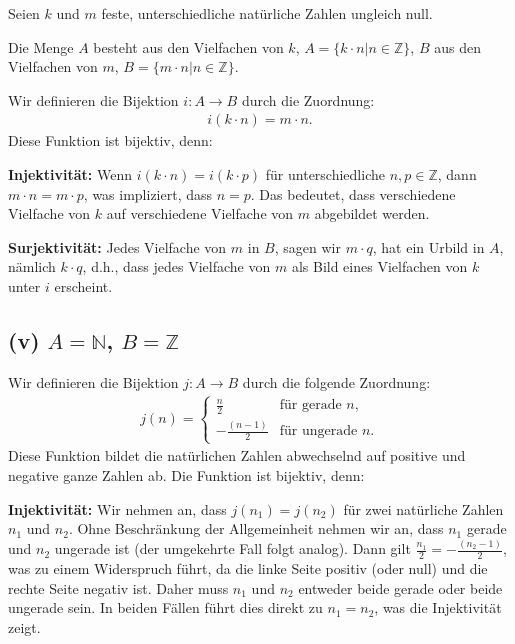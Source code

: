 \documentclass[12pt]{article}
\begin{document}
Seien \( k \) und \( m \) feste, unterschiedliche natürliche Zahlen ungleich null.

Die Menge \( A \) besteht aus den Vielfachen von \( k \), \( A = \{k \cdot n | n \in \mathbb{Z}\} \), \( B \) aus den Vielfachen von \( m \), \( B = \{m \cdot n | n \in \mathbb{Z}\} \).

Wir definieren die Bijektion \( i : A \rightarrow B \) durch die Zuordnung:
\begin{align*}
	i(k \cdot n) = m \cdot n.
\end{align*}
Diese Funktion ist bijektiv, denn:

\textbf{Injektivität:} Wenn \( i(k \cdot n) = i(k \cdot p)\) für unterschiedliche \( n, p \in \mathbb{Z}\), dann \( m \cdot n = m \cdot p \), was impliziert, dass \( n = p \). Das bedeutet, dass verschiedene Vielfache von \( k \) auf verschiedene Vielfache von \( m \) abgebildet werden.

\textbf{Surjektivität:} Jedes Vielfache von \( m \) in \( B \), sagen wir \( m \cdot q \), hat ein Urbild in \( A \), nämlich \( k \cdot q \), d.h., dass jedes Vielfache von \( m \) als Bild eines Vielfachen von \( k \) unter \( i \) erscheint.

\subsection*{(v) \( A = \mathbb{N} \), \( B = \mathbb{Z} \)}

Wir definieren die Bijektion \( j: A \rightarrow B \) durch die folgende Zuordnung:
\begin{align*}
	j(n) =
	\begin{cases}
		\frac{n}{2}      & \text{für gerade } n,   \\
		-\frac{(n-1)}{2} & \text{für ungerade } n.
	\end{cases}
\end{align*}
Diese Funktion bildet die natürlichen Zahlen abwechselnd auf positive und negative ganze Zahlen ab. Die Funktion ist bijektiv, denn:

\textbf{Injektivität:} Wir nehmen an, dass \( j(n_1) = j(n_2) \) für zwei natürliche Zahlen \( n_1 \) und \( n_2 \). Ohne Beschränkung der Allgemeinheit nehmen wir an, dass \( n_1 \) gerade und \( n_2 \) ungerade ist (der umgekehrte Fall folgt analog). Dann gilt \( \frac{n_1}{2} = -\frac{(n_2-1)}{2} \), was zu einem Widerspruch führt, da die linke Seite positiv (oder null) und die rechte Seite negativ ist. Daher muss \( n_1 \) und \( n_2 \) entweder beide gerade oder beide ungerade sein. In beiden Fällen führt dies direkt zu \( n_1 = n_2 \), was die Injektivität zeigt.
\end{document}
